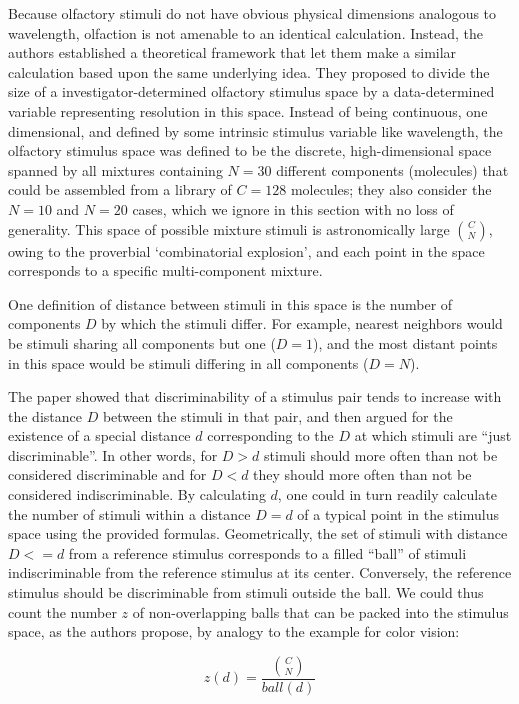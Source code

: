 \documentclass[letterpaper,twocolumn,10pt]{article}
\begin{document}
Because olfactory stimuli do not have obvious physical dimensions analogous to wavelength, 
olfaction is not amenable to an identical calculation.  
Instead, the authors established a theoretical framework that let them make a similar calculation based upon the same underlying idea.  
They proposed to divide the size of a investigator-determined olfactory stimulus space by a data-determined variable representing resolution in this space. 
Instead of being continuous, one dimensional, and defined by some intrinsic stimulus variable like wavelength, 
the olfactory stimulus space was defined to be the discrete, high-dimensional space spanned by all mixtures containing $N=30$ different components (molecules) that could be assembled from a library of $C=128$ molecules; 
they also consider the $N=10$ and $N=20$ cases, which we ignore in this section with no loss of generality. 
This space of possible mixture stimuli is astronomically large ${C \choose N}$, 
owing to the proverbial `combinatorial explosion', 
and each point in the space corresponds to a specific multi-component mixture. 

One definition of distance between stimuli in this space is the number of components $D$ by which the stimuli differ. 
For example, nearest neighbors would be stimuli sharing all components but one ($D=1$), 
and the most distant points in this space would be stimuli differing in all components ($D=N$). 

The paper showed that discriminability of a stimulus pair tends to increase with the distance $D$ between the stimuli in that pair, 
and then argued for the existence of a special distance $d$ corresponding to the $D$ at which stimuli are ``just discriminable''.  
In other words, for $D>d$ stimuli should more often than not be considered discriminable 
and for $D<d$ they should more often than not be considered indiscriminable.  
By calculating $d$, one could in turn readily calculate the number of stimuli within a distance $D=d$ of a typical point in the stimulus space using the provided formulas. 
Geometrically, the set of stimuli with distance $D<=d$ from a reference stimulus corresponds to a filled “ball” of stimuli indiscriminable from the reference stimulus at its center.  
Conversely, the reference stimulus should be discriminable from stimuli outside the ball.  
We could thus count the number $z$ of non-overlapping balls that can be packed into the stimulus space, 
as the authors propose, by analogy to the example for color vision: 

\begin{equation}
\label{eq:disc}
z(d) = \frac{\binom{C}{N}}{ball(d)}  
\end{equation}
\end{document}
